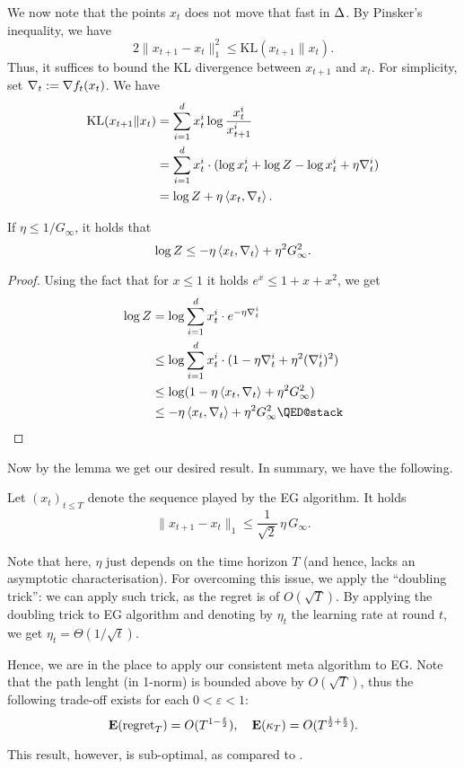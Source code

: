 We now note that the points $x_t$ does not move that fast in $\Delta$. By Pinsker's inequality, we have
\[
    2\|x_{t+1} - x_t\|_1^2 \leq \mathrm{KL}(x_{t+1}\|x_t).
\]
Thus, it suffices to bound the KL divergence between $x_{t+1}$ and $x_t$. For simplicity, set $\nabla_t := \nabla f_t(x_t)$. We have
\begin{align*}
    \mathrm{KL}(x_{t+1}\|x_t) &= \sum_{i=1}^d x_t^i \log\frac{x_t^i}{x_{t+1}^i} \\
                              &= \sum_{i=1}^d x_t^i \cdot (\log x_t^i + \log Z - \log x_{t}^i + \eta \nabla_t^i) \\
                              &= \log Z + \eta \left\langle x_t,\nabla_t \right\rangle.
\end{align*}
\begin{lemma}
    If $\eta \leq 1/G_\infty$, it holds that
    \[
        \log Z \leq -\eta\left\langle x_t,\nabla_t \right\rangle + \eta^2 G_\infty^2.
    \]
\end{lemma}
\begin{proof}
    Using the fact that for $x \leq 1$ it holds $e^x \leq 1 + x + x^2$, we get
    \begin{align*}
        \log Z &= \log \sum_{i=1}^d x_t^i \cdot e^{-\eta \grad_t^i} \\
               &\leq \log \sum_{i=1}^d x_t^i\cdot (1 - \eta\grad_t^i + \eta^2(\grad_t^i)^2) \\
               &\leq \log (1 - \eta\inner{x_t}{\grad_t} + \eta^2G_\infty^2) \\
               &\leq - \eta\inner{x_t}{\grad_t} + \eta^2G_\infty^2 \qedhere
    \end{align*}
\end{proof}

Now by the lemma we get our desired result. In summary, we have the following.
\begin{proposition}
    Let $(x_t)_{t\leq T}$ denote the sequence played by the EG algorithm. It holds
    \[
        \|x_{t+1} - x_t\|_1 \leq \frac{1}{\sqrt{2}}\,\eta\, G_\infty.
    \]
\end{proposition}

Note that here, $\eta$ just depends on the time horizon $T$ (and hence, lacks an asymptotic characterisation). For overcoming this issue, we apply the ``doubling trick'': we can apply such trick, as the regret is of $O(\sqrt{T})$. By applying the doubling trick to EG algorithm and denoting by $\eta_t$ the learning rate at round $t$, we get $\eta_t = \Theta(1/\sqrt{t})$.

Hence, we are in the place to apply our consistent meta algorithm to EG. Note that the path lenght (in 1-norm) is bounded above by $O(\sqrt{T})$, thus the following trade-off exists for each $0<\varepsilon<1$:
\[
    \mathbf{E}(\mathrm{regret}_T) = O(T^{1-\frac{\varepsilon}{2}}),\quad \mathbf{E}(\kappa_T) = O(T^{\frac{1}{2} + \frac{\varepsilon}{2}}).
\]

This result, however, is sub-optimal, as compared to \citet{altschuler2018online}.

